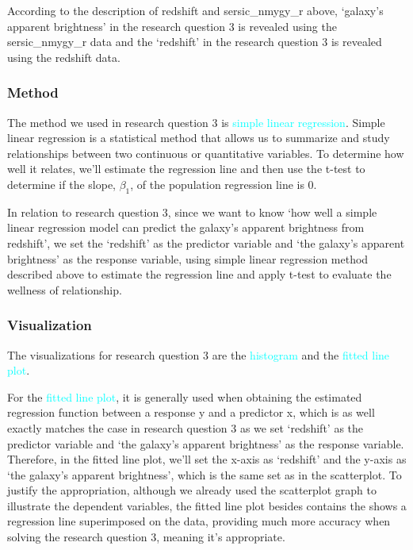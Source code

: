 \documentclass[12pt]{article}
\begin{document}
\noindent According to the description of redshift and sersic\_nmygy\_r above, `galaxy's apparent brightness' in the research question 3 is revealed using the sersic\_nmygy\_r data and the `redshift' in the research question 3 is revealed using the redshift data.

\subsubsection{Method}

The method we used in research question 3 is \textcolor{cyan}{simple linear regression}. Simple linear regression is a statistical method that allows us to summarize and study relationships between two continuous or quantitative variables. To determine how well it relates, we'll estimate the regression line and then use the t-test to determine if the slope, $\beta_1$, of the population regression line is 0.

\noindent In relation to research question 3, since we want to know `how well a simple linear regression model can predict the galaxy's apparent brightness from redshift', we set the `redshift' as the predictor variable and `the galaxy's apparent brightness' as the response variable, using simple linear regression method described above to estimate the regression line and apply t-test to evaluate the wellness of relationship. 

\subsubsection{Visualization}

The visualizations for research question 3 are the \textcolor{cyan}{histogram} and the \textcolor{cyan}{fitted line plot}.


\noindent For the \textcolor{cyan}{fitted line plot}, it is generally used when obtaining the estimated regression function between a response y and a predictor x, which is as well exactly matches the case in research question 3 as we set `redshift' as the predictor variable and `the galaxy's apparent brightness' as the response variable. Therefore, in the fitted line plot, we'll set the x-axis as `redshift' and the y-axis as `the galaxy's apparent brightness', which is the same set as in the scatterplot. To justify the appropriation, although we already used the scatterplot graph to illustrate the dependent variables, the fitted line plot besides contains the shows a regression line superimposed on the data, providing much more accuracy when solving the research question 3, meaning it's appropriate. 
\end{document}
